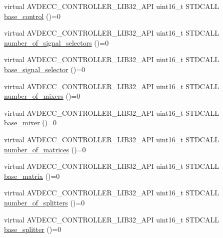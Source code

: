 \begin{DoxyCompactItemize}
virtual A\+V\+D\+E\+C\+C\+\_\+\+C\+O\+N\+T\+R\+O\+L\+L\+E\+R\+\_\+\+L\+I\+B32\+\_\+\+A\+PI uint16\+\_\+t S\+T\+D\+C\+A\+LL \hyperlink{classavdecc__lib_1_1audio__unit__descriptor__response_ac1f5297533142234c764e84c01ce5a16}{base\+\_\+control} ()=0
\item 
virtual A\+V\+D\+E\+C\+C\+\_\+\+C\+O\+N\+T\+R\+O\+L\+L\+E\+R\+\_\+\+L\+I\+B32\+\_\+\+A\+PI uint16\+\_\+t S\+T\+D\+C\+A\+LL \hyperlink{classavdecc__lib_1_1audio__unit__descriptor__response_a350017f1d53dba157c2df60426d3e276}{number\+\_\+of\+\_\+signal\+\_\+selectors} ()=0
\item 
virtual A\+V\+D\+E\+C\+C\+\_\+\+C\+O\+N\+T\+R\+O\+L\+L\+E\+R\+\_\+\+L\+I\+B32\+\_\+\+A\+PI uint16\+\_\+t S\+T\+D\+C\+A\+LL \hyperlink{classavdecc__lib_1_1audio__unit__descriptor__response_a6d7d2edd587a7d86e5baf733b8edfa13}{base\+\_\+signal\+\_\+selector} ()=0
\item 
virtual A\+V\+D\+E\+C\+C\+\_\+\+C\+O\+N\+T\+R\+O\+L\+L\+E\+R\+\_\+\+L\+I\+B32\+\_\+\+A\+PI uint16\+\_\+t S\+T\+D\+C\+A\+LL \hyperlink{classavdecc__lib_1_1audio__unit__descriptor__response_a149b4c82d8617ca1b8a1fab50d2f73b4}{number\+\_\+of\+\_\+mixers} ()=0
\item 
virtual A\+V\+D\+E\+C\+C\+\_\+\+C\+O\+N\+T\+R\+O\+L\+L\+E\+R\+\_\+\+L\+I\+B32\+\_\+\+A\+PI uint16\+\_\+t S\+T\+D\+C\+A\+LL \hyperlink{classavdecc__lib_1_1audio__unit__descriptor__response_afba53952304abeb8ae5cfba51f91fa8a}{base\+\_\+mixer} ()=0
\item 
virtual A\+V\+D\+E\+C\+C\+\_\+\+C\+O\+N\+T\+R\+O\+L\+L\+E\+R\+\_\+\+L\+I\+B32\+\_\+\+A\+PI uint16\+\_\+t S\+T\+D\+C\+A\+LL \hyperlink{classavdecc__lib_1_1audio__unit__descriptor__response_ac47cb4ee3e605cbbf9d4332ba9df2930}{number\+\_\+of\+\_\+matrices} ()=0
\item 
virtual A\+V\+D\+E\+C\+C\+\_\+\+C\+O\+N\+T\+R\+O\+L\+L\+E\+R\+\_\+\+L\+I\+B32\+\_\+\+A\+PI uint16\+\_\+t S\+T\+D\+C\+A\+LL \hyperlink{classavdecc__lib_1_1audio__unit__descriptor__response_ae35ea1aade036bd33159a9c5c87b9dd7}{base\+\_\+matrix} ()=0
\item 
virtual A\+V\+D\+E\+C\+C\+\_\+\+C\+O\+N\+T\+R\+O\+L\+L\+E\+R\+\_\+\+L\+I\+B32\+\_\+\+A\+PI uint16\+\_\+t S\+T\+D\+C\+A\+LL \hyperlink{classavdecc__lib_1_1audio__unit__descriptor__response_a2cd4a61129fec7c3f1b37d7a504e2e67}{number\+\_\+of\+\_\+splitters} ()=0
\item 
virtual A\+V\+D\+E\+C\+C\+\_\+\+C\+O\+N\+T\+R\+O\+L\+L\+E\+R\+\_\+\+L\+I\+B32\+\_\+\+A\+PI uint16\+\_\+t S\+T\+D\+C\+A\+LL \hyperlink{classavdecc__lib_1_1audio__unit__descriptor__response_a6588160c2bb71ab5bb4159ed2867e38a}{base\+\_\+splitter} ()=0

\end{DoxyCompactItemize}
